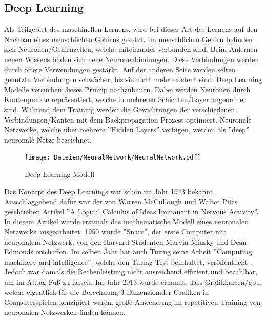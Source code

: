 \documentclass[12pt,a4paper]{article}
\begin{document}
\subsection{Deep Learning}
	Als Teilgebiet des maschinellen Lernens, wird bei dieser Art des Lernens auf den Nachbau eines menschlichen Gehirns gesetzt.
	Im menschlichen Gehirn befinden sich Neuronen/Gehirnzellen, welche miteinander verbunden sind. 
	Beim Anlernen neuen Wissens bilden sich neue Neuronenbindungen.
	Diese Verbindungen werden durch öftere Verwendungen gestärkt.
	Auf der anderen Seite werden selten genutzte Verbindungen schwächer, bis sie nicht mehr existent sind.
	Deep Learning Modelle versuchen dieses Prinzip nachzubauen.
	Dabei werden Neuronen durch Knotenpunkte repräsentiert, welche in mehreren Schichten/Layer angeordnet sind.
	Während dem Training werden die Gewichtungen der verschiedenen Verbindungen/Kanten mit dem Backpropagation-Prozess optimiert.
	Neuronale Netzwerke, welche über mehrere ''Hidden Layers'' verfügen, werden als ''deep'' neuronale Netze bezeichnet.
	 \cite[\ac{vgl}][S.424]{10.1111/bjd.18880}
	\begin{figure}[H]
		\begin{center}
			\texttt{[image: Dateien/NeuralNetwork/NeuralNetwork.pdf]}
			\caption{Deep Learning Modell \cite[][]{site:neuralnetwork}}
			\label{img:deeplearning}
		\end{center}
	\end{figure}
	Das Konzept des Deep Learnings war schon im Jahr 1943 bekannt.
	Ausschlaggebend dafür war der von Warren McCullough und Walter Pitts geschrieben Artikel ''A Logical Calculus of Ideas Immanent in Nervous Activity''.
	In diesem Artikel wurde erstmals das mathematische Modell eines neuronalen Netzwerks ausgearbeitet.
	1950 wurde ''Snarc'', der erste Computer mit neuronalem Netzwerk, von den Harvard-Studenten Marvin Minsky und Dean Edmonds erschaffen.
	Im selben Jahr hat auch Turing seine Arbeit ''Computing machinery and intelligence'', welche den Turing-Test beinhaltet, veröffentlicht \cite[\ac{vgl}][]{site:datascientestki}.
	Jedoch war damals die Rechenleistung nicht ausreichend effizient und bezahlbar, um im Alltag Fuß zu fassen.
	Im Jahr 2013 wurde erkannt, dass Grafikkarten/\ac{gpu}, welche eigentlich für die Berechnung 3-Dimensionaler Grafiken in Computerspielen konzipiert waren, große Anwendung im repetitiven Training von neuronalen Netzwerken finden können.
\end{document}
